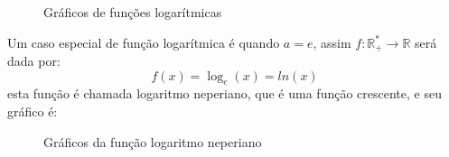  \begin{figure}[H]
   \caption{Gráficos de funções logarítmicas}
  \end{figure}

 Um caso especial de função logarítmica é quando $a= e$, assim $f: \mathbb{R_{+}^{*}} \rightarrow \mathbb{R} $ será dada por:
  \[f(x) = \log_{e}(x)= ln(x)\]
 esta função é chamada logaritmo neperiano, que é uma função crescente, e seu gráfico é:

  \begin{figure}[H]
 \centering
    \caption{Gráficos da função logaritmo neperiano}
  \end{figure}

